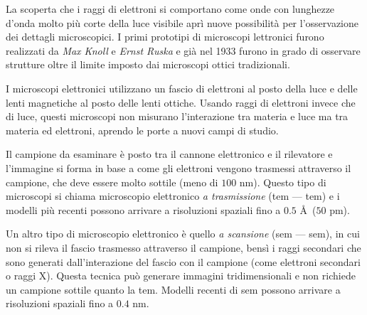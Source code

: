 \documentclass[../main.tex]{subfiles}
\begin{document}
La scoperta che i raggi di elettroni si comportano come onde con lunghezze d'onda molto più corte della luce visibile aprì nuove possibilità per l'osservazione dei dettagli microscopici. I primi prototipi di microscopi lettronici furono realizzati da \textit{Max Knoll} e \textit{Ernst Ruska}\cite{oatley1982early} e già nel 1933 furono in grado di osservare strutture oltre il limite imposto dai microscopi ottici tradizionali.\cite{physics_nobel}

I microscopi elettronici utilizzano un fascio di elettroni al posto della luce e delle lenti magnetiche al posto delle lenti ottiche. Usando raggi di elettroni invece che di luce, questi microscopi non misurano l'interazione tra materia e luce ma tra materia ed elettroni, aprendo le porte a nuovi campi di studio.

Il campione da esaminare è posto tra il cannone elettronico e il rilevatore e l'immagine si forma in base a come gli elettroni vengono trasmessi attraverso il campione, che deve essere molto sottile (meno di $100$ nm). Questo tipo di microscopi si chiama microscopio elettronico \textit{a trasmissione} (\acrlong{tem} --- \acrshort{tem}) e i modelli più recenti possono arrivare a risoluzioni spaziali fino a $0.5$ \AA\ ($50$ pm).\cite{rolf_2009}

Un altro tipo di microscopio elettronico è quello \textit{a scansione} (\acrlong{sem} --- \acrshort{sem}), in cui non si rileva il fascio trasmesso attraverso il campione, bensì i raggi secondari che sono generati dall'interazione del fascio con il campione (come elettroni secondari o raggi X). Questa tecnica può generare immagini tridimensionali e non richiede un campione sottile quanto la \acrshort{tem}. Modelli recenti di \acrshort{sem} possono arrivare a risoluzioni spaziali fino a $0.4$ nm.\cite{hitachi_sem}\bigskip
\end{document}
